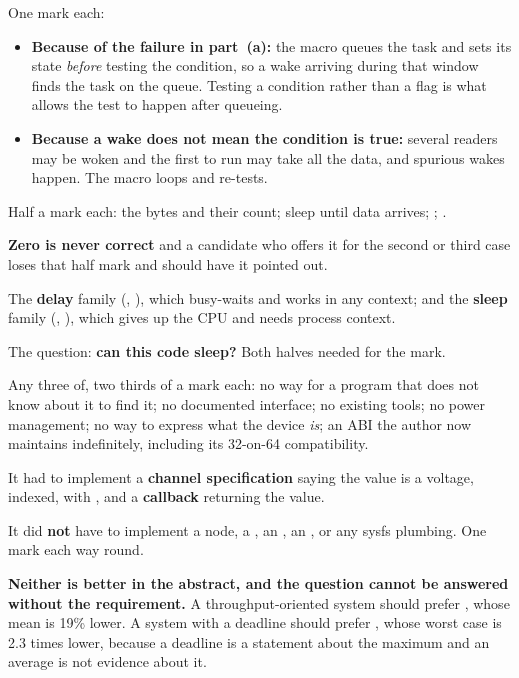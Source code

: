 One mark each:
\begin{itemize}
  \item \textbf{Because of the failure in part~(a):} the macro queues the task and sets its state
    \emph{before} testing the condition, so a wake arriving during that window finds the task on the
    queue. Testing a condition rather than a flag is what allows the test to happen after queueing.
  \item \textbf{Because a wake does not mean the condition is true:} several readers may be woken
    and the first to run may take all the data, and spurious wakes happen. The macro loops and
    re-tests.
\end{itemize}

Half a mark each: the bytes and their count; sleep until data arrives; ;
.

\textbf{Zero is never correct} and a candidate who offers it for the second or third case loses that
half mark and should have it pointed out.

The \textbf{delay} family (, ), which busy-waits and works in any context;
and the \textbf{sleep} family (, ), which gives up the CPU and needs
process context.

The question: \textbf{can this code sleep?} Both halves needed for the mark.


Any three of, two thirds of a mark each: no way for a program that does not know about it to find
it; no documented interface; no existing tools; no power management; no way to express what the
device \emph{is}; an  ABI the author now maintains indefinitely, including its 32-on-64
compatibility.

It had to implement a \textbf{channel specification} saying the value is a voltage, indexed, with
, and a \textbf{ callback} returning the value.

It did \textbf{not} have to implement a  node, a , an , an
, or any sysfs plumbing. One mark each way round.

\textbf{Neither is better in the abstract, and the question cannot be answered without the
requirement.} A throughput-oriented system should prefer , whose mean is 19\% lower. A
system with a deadline should prefer , whose worst case is 2.3 times lower, because
a deadline is a statement about the maximum and an average is not evidence about it.

